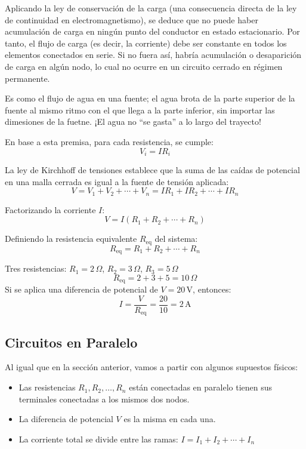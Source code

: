 Aplicando la ley de conservación de la carga (una consecuencia directa de la ley de continuidad en electromagnetismo), se deduce que no puede haber acumulación de carga en ningún punto del conductor en estado estacionario. Por tanto, el flujo de carga (es decir, la corriente) debe ser constante en todos los elementos conectados en serie. Si no fuera así, habría acumulación o desaparición de carga en algún nodo, lo cual no ocurre en un circuito cerrado en régimen permanente.

Es como el flujo de agua en una fuente; el agua brota de la parte superior de la fuente al mismo ritmo con el que llega a la parte inferior, sin importar las dimesiones de la fuetne. ¡El agua no ``se gasta'' a lo largo del trayecto!

En base a esta premisa, para cada resistencia, se cumple:
\[
  V_i = I R_i
\]

La ley de Kirchhoff de tensiones establece que la suma de las caídas de potencial en una malla cerrada es igual a la fuente de tensión aplicada:
\[
  V = V_1 + V_2 + \cdots + V_n = IR_1 + IR_2 + \cdots + IR_n
\]

Factorizando la corriente \( I \):
\[
  V = I (R_1 + R_2 + \cdots + R_n)
\]

Definiendo la resistencia equivalente \( R_{\text{eq}} \) del sistema:
\[
  \boxed{R_{\text{eq}} = R_1 + R_2 + \cdots + R_n}
\]

\begin{example}
Tres resistencias: \( R_1 = 2 \, \Omega \), \( R_2 = 3 \, \Omega \), \( R_3 = 5 \, \Omega \)
\[
  R_{\text{eq}} = 2 + 3 + 5 = 10 \, \Omega
\]
Si se aplica una diferencia de potencial de \( V = 20 \, \text{V} \), entonces:
\[
  I = \frac{V}{R_{\text{eq}}} = \frac{20}{10} = 2 \, \text{A}
\]
\end{example}

\subsection{Circuitos en Paralelo}

Al igual que en la sección anterior, vamos a partir con algunos supuestos físicos:
\begin{itemize}
  \item Las resistencias \( R_1, R_2, \dots,R_n \) están conectadas en paralelo tienen sus terminales conectadas a los mismos dos nodos.
  \item La diferencia de potencial \( V \) es la misma en cada una.
  \item La corriente total se divide entre las ramas: \( I = I_1 + I_2 + \cdots + I_n \)
\end{itemize}

